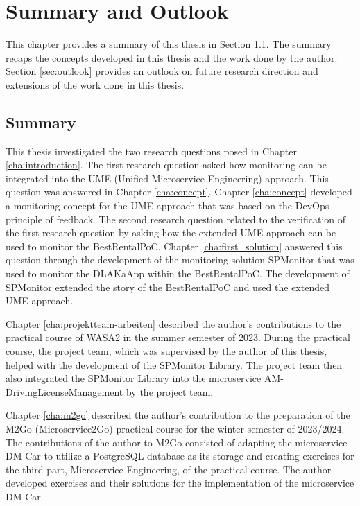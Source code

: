 \chapter{Summary and Outlook}
\label{cha:outlook}

This chapter provides a summary of this thesis in Section \ref{sec:summary}.
The summary recaps the concepts developed in this thesis and the work
done by the author. Section \ref{sec:outlook} provides an outlook
on future research direction and extensions of the work done in this thesis.

\section{Summary}
\label{sec:summary}

This thesis investigated the two research questions posed in Chapter \ref{cha:introduction}.
The first research question asked how monitoring can be integrated into the
UME (Unified Microservice Engineering) approach. This question was answered in Chapter \ref{cha:concept}.
Chapter \ref{cha:concept} developed a monitoring concept for the UME approach that was
based on the DevOps principle of feedback.
The second research question related to the verification of the first research question
by asking how the extended UME approach can be used to monitor the BestRentalPoC.
Chapter \ref{cha:first_solution} answered this question through the development
of the monitoring solution SPMonitor that was used to monitor the DLAKaApp within the BestRentalPoC.
The development of SPMonitor extended the story of the BestRentalPoC and used the extended
UME approach.

Chapter \ref{cha:projektteam-arbeiten} described the author's contributions to the
practical course of WASA2 in the summer semester of 2023. During the practical course,
the project team, which was supervised by the author of this thesis, helped with the development
of the SPMonitor Library. The project team then also integrated the SPMonitor Library
into the microservice AM-DrivingLicenseManagement by the project team.

Chapter \ref{cha:m2go} described the author's contribution to the preparation
of the M2Go (Microservice2Go) practical course for the winter semester of 2023/2024.
The contributions of the author to M2Go consisted of adapting the microservice
DM-Car to utilize a PostgreSQL database as its storage and creating exercises
for the third part, Microservice Engineering, of the practical course.
The author developed exercises and their solutions for the implementation
of the microservice DM-Car.

